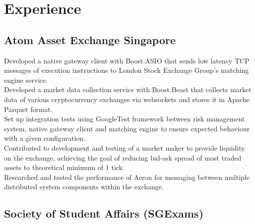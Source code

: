\documentclass[a4paper,hidelinks]{resume} %
\begin{document}
\begin{minipage}[t]{0.50\textwidth} %

    
    \section{Experience}
    
    \sectionspace %
    
    \subsection{Atom Asset Exchange Singapore}
    
    \textbullet{} Developed a native gateway client with Boost.ASIO that sends low latency TCP messages of execution instructions to London Stock Exchange Group’s matching engine service. \\
    \textbullet{} Developed a market data collection service with Boost.Beast that collects market data of various cryptocurrency exchanges via websockets and stores it in Apache Parquet format. \\
    \textbullet{} Set up integration tests using GoogleTest framework between risk management system, native gateway client and matching engine to ensure expected behaviour with a given configuration. \\
    \textbullet{} Contributed to development and testing of a market maker to provide liquidity on the exchange, achieving the goal of reducing bid-ask spread of most traded assets to theoretical minimum of 1 tick.\\
    \textbullet{} Researched and tested the performance of Aeron for messaging between multiple distributed system components within the exchange. \\
    
    \sectionspace %
    
    
    \subsection{Society of Student Affairs (SGExams)}
    

\end{minipage}
\end{document}
